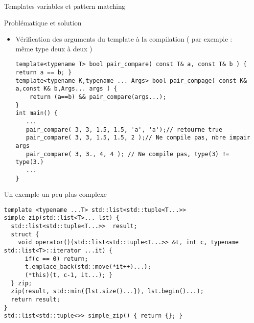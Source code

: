 \documentclass[handout,10pt]{beamer}
\begin{document}
\begin{frame}[fragile]{Templates variables et pattern matching}
\tiny
\begin{block}{Problématique et solution}
\begin{itemize}
\item Vérification des arguments du template à la compilation ( par exemple : même type deux à deux )
\begin{lstlisting}
template<typename T> bool pair_compare( const T& a, const T& b ) { return a == b; }
template<typename K,typename ... Args> bool pair_compage( const K& a,const K& b,Args... args ) {
    return (a==b) && pair_compare(args...);
}
int main() {
   ...
   pair_compare( 3, 3, 1.5, 1.5, 'a', 'a');// retourne true
   pair_compare( 3, 3, 1.5, 1.5, 2 );// Ne compile pas, nbre impair args
   pair_compare( 3, 3., 4, 4 ); // Ne compile pas, type(3) != type(3.)
   ...
}
\end{lstlisting}
\end{itemize}
\end{block}

\begin{block}{Un exemple un peu plus complexe}
\begin{lstlisting}
template <typename ...T> std::list<std::tuple<T...>> simple_zip(std::list<T>... lst) {
  std::list<std::tuple<T...>>  result;
  struct {
    void operator()(std::list<std::tuple<T...>> &t, int c, typename std::list<T>::iterator ...it) {
      if(c == 0) return;
      t.emplace_back(std::move(*it++)...);
      (*this)(t, c-1, it...); }
  } zip;
  zip(result, std::min({lst.size()...}), lst.begin()...);
  return result;
}
std::list<std::tuple<>> simple_zip() { return {}; }
\end{lstlisting}	
\end{block}
\end{frame}
\end{document}
